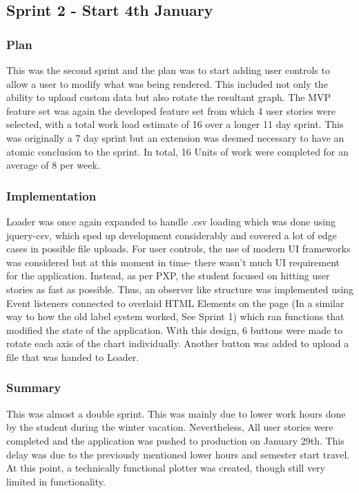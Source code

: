 \subsection{Sprint 2 - Start 4th January}
\subsubsection{Plan}
This was the second sprint and the plan was to start adding user controls to allow a user to modify what was being rendered. This included not only the ability to upload custom data but also rotate the resultant graph. The MVP feature set was again the developed feature set from which 4 user stories were selected, with a total work load estimate of 16 over a longer 11 day sprint. This was originally a 7 day sprint but an extension was deemed necessary to have an atomic conclusion to the sprint. In total, 16 Units of work were completed for an average of 8 per week.

\subsubsection{Implementation}
Loader was once again expanded to handle .csv loading which was done using jquery-csv, which sped up development considerably and covered a lot of edge cases in possible file uploads. For user controls, the use of modern UI frameworks was considered but at this moment in time- there wasn't much UI requirement for the application. Instead, as per PXP, the student focused on hitting user stories as fast as possible. Thus, an observer like structure was implemented using Event listeners connected to overlaid HTML Elements on the page (In a similar way to how the old label system worked, See Sprint 1) which ran functions that modified the state of the application. With this design, 6 buttons were made to rotate each axis of the chart individually. Another button was added to upload a file that was handed to Loader.

\subsubsection{Summary}
This was almost a double sprint. This was mainly due to lower work hours done by the student during the winter vacation. Nevertheless, All user stories were completed and the application was pushed to production on January 29th. This delay was due to the previously mentioned lower hours and semester start travel. At this point, a technically functional plotter was created, though still very limited in functionality.